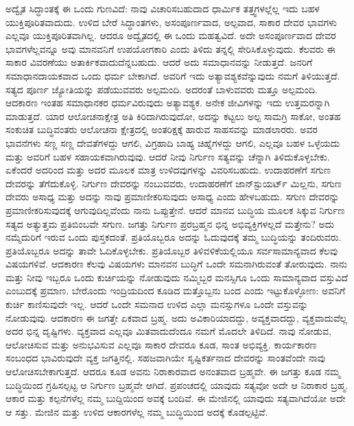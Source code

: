 ಅದ್ವೈತ ಸಿದ್ಧಾಂತಕ್ಕೆ ಈ ಒಂದು ಗುಣವಿದೆ: ನಾವು ವಿಚಾರಿಸಬಹುದಾದ ಧಾರ್ಮಿಕ ತತ್ತ್ವಗಳಲ್ಲೆಲ್ಲ ಇದು ಬಹಳ ಯುಕ್ತಿಪೂರಿತವಾದುದು. ಉಳಿದ ಬೇರೆ ಸಿದ್ಧಾಂತಗಳು, ಅಸಂಪೂರ್ಣವಾದ, ಅಲ್ಪವಾದ, ಸಾಕಾರ ದೇವರ ಭಾವಗಳು ಎಲ್ಲವೂ ಯುಕ್ತಿಪೂರಿತವಾಗಿಲ್ಲ. ಆದರೂ ಅದ್ವೈತದಲ್ಲಿ ಈ ಒಂದು ಮಹತ್ವವಿದೆ. ಅದೇ ಅಸಂಪೂರ್ಣವಾದ ದೇವರ ಭಾವಗಳೆಲ್ಲವನ್ನೂ ಅವು ಮಾನವನಿಗೆ ಉಪಯೋಗಕಾರಿ ಎಂದು ತಿಳಿದು ತನ್ನಲ್ಲಿ ಸೇರಿಸಿಕೊಳ್ಳುವುದು. ಕೆಲವರು ಈ ಸಾಕಾರ ವಿವರಣೆಯು ಅತಾರ್ಕಿಕವಾದುದೆನ್ನಬಹುದು. ಆದರೆ ಅದು ಸಮಾಧಾನವನ್ನು ನೀಡುತ್ತದೆ. ಜನರಿಗೆ ಸಮಾಧಾನದಾಯಕವಾದ ಒಂದು ಧರ್ಮ ಬೇಕಾಗಿದೆ. ಅವರಿಗೆ ಇದು ಅತ್ಯಾವಶ್ಯಕವೆನ್ನುವುದು ನಮಗೆ ತಿಳಿಯುತ್ತದೆ. ಸತ್ಯದ ಪೂರ್ಣ ಜ್ಯೋತಿಯನ್ನು ಪಡೆಯುವವರು ಅಲ್ಪಮಂದಿ. ಅದರಂತೆ ಬಾಳುವವರು ಮತ್ತೂ ಅಲ್ಪಮಂದಿ. ಆದಕಾರಣ ಇಂತಹ ಸಮಾಧಾನಕರ ಧರ್ಮವಿರುವುದು ಅತ್ಯಾವಶ್ಯಕ. ಅನೇಕ ಜೀವಿಗಳನ್ನು ಇದು ಉತ್ತಮರನ್ನಾಗಿ ಮಾಡುತ್ತದೆ. ಯಾರ ಆಲೋಚನಾಕ್ಷೇತ್ರ ಅತಿ ಕಿರಿದಾಗಿರುವುದೋ, ಅದನ್ನು ಕಟ್ಟಲು ಅಲ್ಪ ಸಾಮಗ್ರಿ ಸಾಕೋ, ಅಂತಹ ಸಂಕುಚಿತ ಬುದ್ಧಿವಂತರು ಆಲೋಚನಾ ಕ್ಷೇತ್ರದಲ್ಲಿ ಅಂತರಿಕ್ಷಕ್ಕೆ ಹಾರುವ ಸಾಹಸವನ್ನು ಮಾಡಲಾರರು. ಅವರ ಭಾವನೆಗಳು ಸಣ್ಣ ಸಣ್ಣ ದೇವತೆಗಳದ್ದು ಆಗಲಿ, ವಿಗ್ರಹಾದಿ ಬಾಹ್ಯ ಚಿಹ್ನೆಗಳದ್ದು ಆಗಲಿ, ಎಲ್ಲವೂ ಬಹಳ ಒಳ್ಳೆಯದು ಮತ್ತು ಅವರಿಗೆ ಬಹಳ ಸಹಾಯಕವಾಗಿರುವುವು. ಆದರೆ ನೀವು ನಿರ್ಗುಣ ಸತ್ಯವನ್ನು ಚೆನ್ನಾಗಿ ತಿಳಿದುಕೊಳ್ಳಬೇಕು. ಏಕೆಂದರೆ ಅದರಿಂದ ಮತ್ತು ಅದರ ಮೂಲಕ ಮಾತ್ರ ಉಳಿದವುಗಳನ್ನು ವಿವರಿಸಬಹುದು. ಉದಾಹರಣೆಗೆ ಸಗುಣ ದೇವರನ್ನು ತೆಗೆದುಕೊಳ್ಳಿ. ನಿರ್ಗುಣ ದೇವರನ್ನು ನಂಬುವವರು, ಉದಾಹರಣೆಗೆ ಜಾನ್​ ಸ್ಟುಯರ್ಟ್​ ಮಿಲ್ಲನು, ಸಗುಣ ದೇವರು ಅಸಾಧ್ಯ ಮತ್ತು ಅದನ್ನು ನಾವು ಪ್ರಮಾಣೀಕರಿಸುವುದು ಅಸಾಧ್ಯ ಎಂದು ಹೇಳಬಹುದು. ಸಗುಣ ದೇವರನ್ನು ಪ್ರಮಾಣೀಕರಿಸುವುದಕ್ಕೆ ಆಗುವುದಿಲ್ಲವೆಂದು ನಾನು ಒಪ್ಪುತ್ತೇನೆ. ಆದರೆ ಮಾನವ ಬುದ್ಧಿಯ ಮೂಲಕ ಸಿಕ್ಕುವ ನಿರ್ಗುಣ ಸತ್ಯದ ಅತ್ಯುತ್ತಮ ಪ್ರತಿಬಿಂಬವೇ ಸಗುಣ. ಜಗತ್ತು ನಿರ್ಗುಣ ಪ್ರರಬ್ರಹ್ಮನ ಭಿನ್ನ ಅಭಿವ್ಯಕ್ತಿಗಳಲ್ಲದೆ ಮತ್ತೇನು? ಅದು ನಮ್ಮೆದುರಿಗೆ ಇರುವ ಒಂದು ಪುಸ್ತಕದಂತೆ. ಪ್ರತಿಯೊಬ್ಬರೂ ಅದನ್ನು ಓದುವುದಕ್ಕೆ ತಮ್ಮ ಬುದ್ಧಿಯನ್ನು ತಂದಿರುವರು. ಪ್ರತಿಯೊಬ್ಬರೂ ಅದನ್ನು ತಾವೇ ಓದಿಕೊಳ್ಳಬೇಕು. ಪ್ರತಿಯೊಬ್ಬರ ತಿಳಿವಳಿಕೆಯಲ್ಲಿಯೂ ಸರ್ವಸಾಮಾನ್ಯವಾದ ಕೆಲವು ವಿಷಯಗಳಿವೆ. ಆದಕಾರಣ ಕೆಲವು ವಿಷಯಗಳು ಮಾನವನ ಬುದ್ಧಿಗೆ ಒಂದೇ ಸಮನಾಗಿರುವಂತೆ ತೋರುವುದು. ನಾನು ಮತ್ತು ನೀವು ಇಬ್ಬರೂ ಒಂದು ಕುರ್ಚಿಯನ್ನು ನೋಡುವುದು ನಮ್ಮಿಬ್ಬರ ಮನಸ್ಸಿಗೂ ಒಂದು ಸಾಮಾನ್ಯವಾದ ವಸ್ತುವಿದೆ ಎಂಬುದಕ್ಕೆ ಪ್ರಮಾಣ. ಬೇರೊಂದು ಇಂದ್ರಿಯದಿಂದ ಕೂಡಿದ ಮತ್ತೊಬ್ಬನು ಬಂದ ಎಂದು ಇಟ್ಟುಕೊಳ್ಳೋಣ: ಅವನಿಗೆ ಕುರ್ಚಿ ಕಾಣಿಸುವುದೇ ಇಲ್ಲ. ಆದರೆ ಒಂದೇ ಸಮನಾದ ಉಳಿದ ಎಲ್ಲಾ ಮನಸ್ಸುಗಳೂ ಒಂದೇ ವಸ್ತುವನ್ನು ನೋಡುವುವು. ಆದಕಾರಣ ಈ ಜಗತ್ತೇ ಏಕವಾದ ಬ್ರಹ್ಮ. ಅದು ಅವಿಕಾರಿಯಾದದ್ದು, ಅವ್ಯಕ್ತವಾದದ್ದು, ವ್ಯಕ್ತವಾದುವೆಲ್ಲ ಅದರ ಭಿನ್ನ ದೃಷ್ಟಿಗಳು. ವ್ಯಕ್ತವಾದ ಎಲ್ಲವೂ ಮಿತವಾದುದೆಂದೂ ನಮಗೆ ಮೊದಲೇ ತಿಳಿದಿದೆ. ನಾವು ನೋಡುವ, ಆಲೋಚಿಸುವ ಮತ್ತು ಅನುಭವಿಸುವ ಎಲ್ಲವೂ ಸಾಕಾರ ದೇವರೂ ಕೂಡ, ಸಾಂತ ಅಭಿವ್ಯಕ್ತಿ. ಕಾರ್ಯಕಾರಣ ಸಂಬಂಧದ ಭಾವಿರುವುದೇ ವ್ಯಕ್ತ ಜಗತ್ತಿನಲ್ಲಿ. ಸಹಜವಾಗಿಯೇ ಸೃಷ್ಟಿಕರ್ತನಾದ ದೇವರನ್ನು ಸಾಂತವೆಂದೇ ನಾವು ಆಲೋಚಿಸಬೇಕಾಗುತ್ತದೆ. ಆದರೂ ಕೂಡ ಅವನು ನಿರಾಕಾರವಾದ ಅನಂತವಾದ ಬ್ರಹ್ಮವೇ. ಈ ಜಗತ್ತು ಕೂಡ ನಮ್ಮ ಬುದ್ಧಿಯಿಂದ ಗ್ರಹಿಸಲ್ಪಟ್ಟ ಆ ನಿರ್ಗುಣ ಬ್ರಹ್ಮವೇ ಆಗಿದೆ. ಪ್ರಪಂಚದಲ್ಲಿ ಯಾವುದು ಸತ್ಯವೋ ಅದೇ ಆ ನಿರಾಕಾರ ಬ್ರಹ್ಮ. ಆಕಾರ ಮತ್ತು ಕಲ್ಪನೆಗಳೆಲ್ಲ ನಮ್ಮ ಬುದ್ದಿಯಿಂದ ಅವಕ್ಕೆ ಬಂದಿವೆ. ಈ ಮೇಜಿನಲ್ಲಿ ಯಾವುದು ಸತ್ಯವಾಗಿದೆಯೋ ಅದೇ ಆ ಸತ್ತು. ಮೇಜಿನ ಮತ್ತು ಉಳಿದ ಆಕಾರಗಳೆಲ್ಲ ನಮ್ಮ ಬುದ್ಧಿಯಿಂದ ಅದಕ್ಕೆ ಕೊಡಲ್ಪಟ್ಟಿವೆ. 

